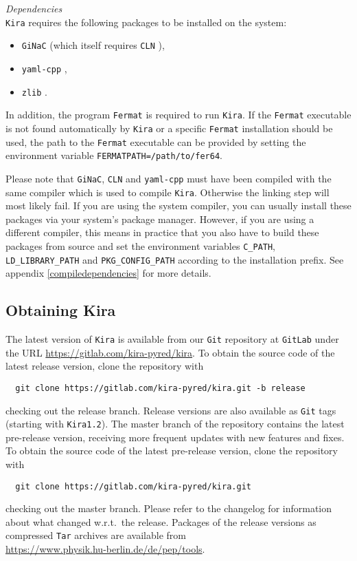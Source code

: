 \documentclass[a4paper,12pt]{article}
\newcommand*{\kira}{\texttt{Kira}}
\newcommand*{\git}{\texttt{Git}}
\newcommand*{\gitlab}{\texttt{GitLab}}
\begin{document}
\medskip
\noindent
\textit{Dependencies}\smallskip\\
\kira{} requires the following packages to be installed on the system:
%
\begin{itemize}
  \item \texttt{GiNaC} \cite{Bauer:2000cp,Vollinga:2005pk} (which itself
    requires \texttt{CLN} \cite{CLN}),
  \item \texttt{yaml-cpp} \cite{YAMLCPP},
  \item \texttt{zlib} \cite{ZLIB}.
\end{itemize}
%
In addition, the program \texttt{Fermat} \cite{Fermat} is required to run
\kira{}.
If the \texttt{Fermat} executable is not found automatically by \kira{} or a
specific \texttt{Fermat} installation should be used, the path to the
\texttt{Fermat} executable can be provided by setting the environment variable
\texttt{FERMATPATH=/path/to/fer64}.

Please note that \texttt{GiNaC}, \texttt{CLN} and \texttt{yaml-cpp} must have
been compiled with the same compiler which is used to compile \kira{}.
Otherwise the linking step will most likely fail.
If you are using the system compiler, you can usually install these packages via
your system's package manager.
However, if you are using a different compiler, this means in practice that you
also have to build these packages from source and set the environment
variables \texttt{C\_PATH}, \texttt{LD\_LIBRARY\_PATH} and
\texttt{PKG\_CONFIG\_PATH} according to the installation prefix.
See appendix \ref{compiledependencies} for more details.


\subsection{Obtaining Kira}

The latest version of \kira{} is available from our \git{} repository at
\gitlab{} under the URL \url{https://gitlab.com/kira-pyred/kira}.
To obtain the source code of the latest release version, clone the repository
with
\begin{verbatim}
  git clone https://gitlab.com/kira-pyred/kira.git -b release
\end{verbatim}
checking out the release branch.
Release versions are also available as \git{} tags (starting with
\kira{}\;\texttt{1.2}).
The master branch of the repository contains the latest pre-release version,
receiving more frequent updates with new features and fixes.
To obtain the source code of the latest pre-release version, clone the
repository with
\begin{verbatim}
  git clone https://gitlab.com/kira-pyred/kira.git
\end{verbatim}
checking out the master branch.
Please refer to the changelog for information about what changed w.r.t.\ the
release.
Packages of the release versions as compressed \texttt{Tar} archives are
available from\\[1.2ex]
\hspace*{2.5ex}\url{https://www.physik.hu-berlin.de/de/pep/tools}.
\end{document}
